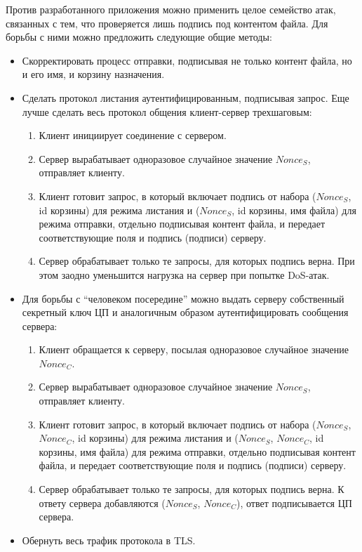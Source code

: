 \documentclass[a4paper,12pt]{article}
\begin{document}
Против разработанного приложения можно применить целое семейство атак, связанных с тем, что проверяется лишь подпись под контентом файла.
Для борьбы с ними можно предложить следующие общие методы:
\begin{itemize}
\item Скорректировать процесс отправки, подписывая не только контент файла, но и его имя, и корзину назначения.
 \item Сделать протокол листания аутентифицированным, подписывая запрос. Еще лучше сделать весь протокол общения клиент-сервер трехшаговым:
 \begin{enumerate}
 \item Клиент инициирует соединение с  сервером.
  \item Сервер вырабатывает одноразовое случайное значение  $Nonce_S$, отправляет клиенту.
  \item Клиент готовит запрос, в который включает подпись от набора ($Nonce_S$, id корзины) для режима листания и
  ($Nonce_S$, id корзины, имя файла) для режима отправки, отдельно подписывая контент файла, и передает соответствующие поля и подпись (подписи) серверу. 
  \item Сервер обрабатывает только те запросы, для которых подпись верна. При этом заодно уменьшится нагрузка на сервер при попытке DoS-атак.
 \end{enumerate}
 \item Для борьбы с ``человеком посередине'' можно выдать серверу собственный секретный ключ ЦП и аналогичным образом аутентифицировать сообщения сервера:
  \begin{enumerate}
  \item Клиент обращается к серверу, посылая одноразовое случайное значение  $Nonce_C$.
  \item Сервер вырабатывает одноразовое случайное значение $Nonce_S$, отправляет клиенту.
  \item Клиент готовит запрос, в который включает подпись от набора ($Nonce_S$, $Nonce_C$, id корзины) для режима листания и
  ($Nonce_S$, $Nonce_C$, id корзины, имя файла) для режима отправки, отдельно подписывая контент файла, и передает соответствующие поля и подпись (подписи) серверу. 
  \item Сервер обрабатывает только те запросы, для которых подпись верна. К ответу сервера добавляются ($Nonce_S$, $Nonce_C$), ответ подписывается ЦП сервера.
  \end{enumerate}
  
\item Обернуть весь трафик протокола в TLS.
 \end{itemize}
\end{document}
